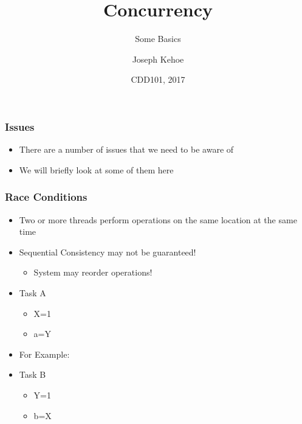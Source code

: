 \documentclass{beamer}
\title[Concurrency] %
{Concurrency}
\subtitle{Some Basics}
\author[Dr. Joseph Kehoe] %
{Joseph Kehoe\inst{1}}
\institute[IT Carlow] %
{
	\inst{1}%
	Department of Computing and Networking\\
	Institute of Technology Carlow
}
\date[ITC 2017] %
{CDD101, 2017}
\begin{document}
 
\frame{\titlepage}
 
 

\begin{frame}
\frametitle{Issues}

\begin{itemize}
\item There are a number of issues that we need to be aware of
\item We will briefly look at some of them here
\end{itemize}
\end{frame}


\begin{frame}
\frametitle{Race Conditions}


\begin{itemize}
\item Two or more threads perform operations on the same location at the same time
\item Sequential Consistency may not be guaranteed!
\begin{itemize}
\item System may reorder operations!
\end{itemize}
\item Task A
\begin{itemize}
\item X=1
\item a=Y
\end{itemize}
\item For Example:
\item Task B
\begin{itemize}
\item Y=1
\item b=X
\end{itemize}

\end{itemize}
\end{frame}
\end{document}
